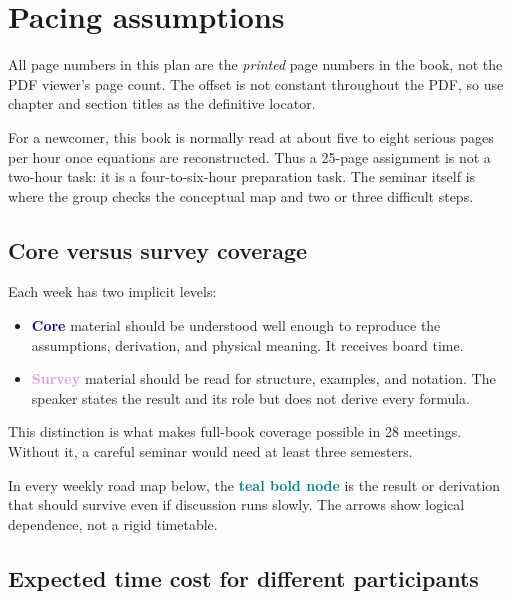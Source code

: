 \documentclass[11pt]{article}
\newcommand{\core}{\textcolor{navy}{\textbf{Core}}}
\newcommand{\survey}{\textcolor{plum}{\textbf{Survey}}}
\newcommand{\essential}[1]{\textcolor{teal}{\textbf{#1}}}
\begin{document}
\tableofcontents
\clearpage
{}

\section{Pacing assumptions}

\begin{warningbox}
All page numbers in this plan are the \emph{printed} page numbers in the book,
not the PDF viewer's page count.  The offset is not constant throughout the PDF,
so use chapter and section titles as the definitive locator.
\end{warningbox}

For a newcomer, this book is normally read at about five to eight serious pages
per hour once equations are reconstructed.  Thus a 25-page assignment is not a
two-hour task: it is a four-to-six-hour preparation task.  The seminar itself is
where the group checks the conceptual map and two or three difficult steps.

\subsection{Core versus survey coverage}

Each week has two implicit levels:

\begin{itemize}
  \item \core{} material should be understood well enough to reproduce the
  assumptions, derivation, and physical meaning.  It receives board time.
  \item \survey{} material should be read for structure, examples, and notation.
  The speaker states the result and its role but does not derive every formula.
\end{itemize}

This distinction is what makes full-book coverage possible in 28 meetings.
Without it, a careful seminar would need at least three semesters.

In every weekly road map below, the \essential{teal bold node} is the result or
derivation that should survive even if discussion runs slowly.  The arrows show
logical dependence, not a rigid timetable.

\subsection{Expected time cost for different participants}
\end{document}
